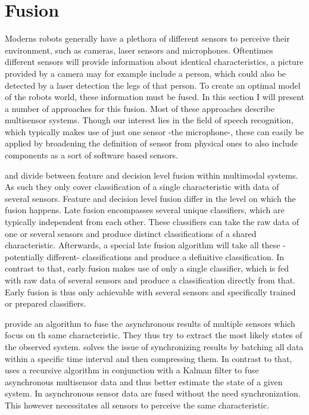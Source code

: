 
\section{Fusion}
\label{related:fusion}
Moderns robots generally have a plethora of different sensors to perceive their environment, such as cameras, laser sensors and microphones.
Oftentimes different sensors will provide information about identical characteristics, a picture provided by a camera may for example include a person, which could also be detected by a laser detection the legs of that person.
To create an optimal model of the robots world, these information must be fused.
In this section I will present a number of approaches for this fusion.
Most of these approaches describe multisensor systems.
Though our interest lies in the field of speech recognition, which typically makes use of just one sensor -the microphone-, these can easily be applied by broadening the definition of sensor from physical ones to also include components as a sort of software based sensors.

\cite{TURK2014189} and \cite{PORIA201650} divide between feature and decision level fusion within multimodal systems.
As such they only cover classification of a single characteristic with data of several sensors.
Feature and decision level fusion differ in the level on which the fusion happens.
Late fusion encompasses several unique classifiers, which are typically independent from each other. 
These classifiers can take the raw data of one or several sensors and produce distinct classifications of a shared characteristic.
Afterwards, a special late fusion algorithm will take all these -potentially different- classifications and produce a definitive classification.
In contrast to that, early fusion makes use of only a single classifier, which is fed with raw data of several sensors and produce a classification directly from that.
Early fusion is thus only achievable with several sensors and specifically trained or prepared classifiers.

\cite{287895} provide an algorithm to fuse the asynchronous results of multiple sensors which focus on th same characteristic.
They thus try to extract the most likely states of the observed system.
\cite{10.1117/12.138164} solves the issue of synchronizing results by batching all data within a specific time interval and then compressing them. 
In contrast to that, \cite{4383603} uses a recursive algorithm in conjunction with a Kalman filter to fuse asynchronous multisensor data and thus better estimate the state of a given system.
In \cite{1468761} asynchronous sensor data are fused without the need synchronization.
This however necessitates all sensors to perceive the same characteristic.
